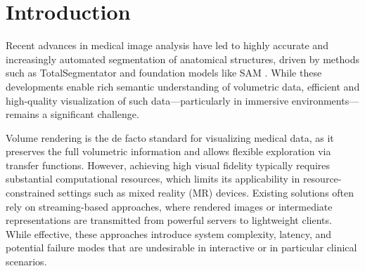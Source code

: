 \documentclass[runningheads]{llncs}
\begin{document}
\begin{abstract}



\end{abstract}
%
%
%

\section{Introduction}

Recent advances in medical image analysis have led to highly accurate and increasingly automated segmentation of anatomical structures, driven by methods such as TotalSegmentator \cite{totalsegmentator} and foundation models like SAM \cite{sam3d}. While these developments enable rich semantic understanding of volumetric data, efficient and high-quality visualization of such data—particularly in immersive environments—remains a significant challenge.

Volume rendering is the de facto standard for visualizing medical data, as it preserves the full volumetric information and allows flexible exploration via transfer functions. However, achieving high visual fidelity typically requires substantial computational resources, which limits its applicability in resource- constrained settings such as mixed reality (MR) devices. Existing solutions often rely on streaming-based approaches, where rendered images or intermediate representations are transmitted from powerful servers to lightweight clients. While effective, these approaches introduce system complexity, latency, and potential failure modes that are undesirable in interactive or in particular clinical scenarios.
\end{document}
